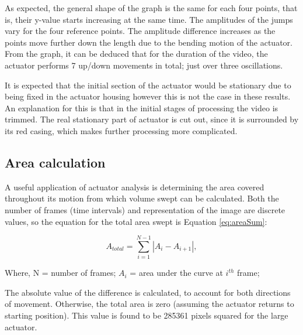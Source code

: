 As expected, the general shape of the graph is the same for each four points, that is, their y-value starts increasing at the same time. The amplitudes of the jumps vary for the four reference points. The amplitude difference increases as the points move further down the length due to the bending motion of the actuator. From the graph, it can be deduced that for the duration of the video, the actuator performs 7 up/down movements in total; just over three oscillations.

It is expected that the initial section of the actuator would be stationary due to being fixed in the actuator housing however this is not the case in these results. An explanation for this is that in the initial stages of processing the video is trimmed. The real stationary part of actuator is cut out, since it is surrounded by its red casing, which makes further processing more complicated.



\subsection{Area calculation}

A useful application of actuator analysis is determining the area covered throughout its motion from which volume swept can be calculated. Both the number of frames (time intervals) and representation of the image are discrete values, so the equation for the total area swept is Equation \ref{eq:areaSum}:

\begin{equation}
	A_{total} = \sum_{i=1}^{N-1} |A_i - A_{i+1}|,
	\label{eq:areaSum}
\end{equation}


Where,
\newline
N = number of frames; \newline
$A_i$ = area under the curve at $i^{th}$ frame; 
\newline


The absolute value of the difference is calculated, to account for both directions of movement. Otherwise, the total area is zero (assuming the actuator returns to starting position).
This value is found to be 285361 pixels squared for the large actuator.

